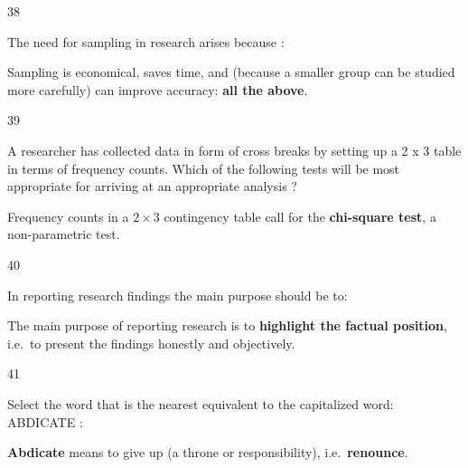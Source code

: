 \begin{question}{38}
{The need for sampling in research arises because :\par}
\begin{explain}
Sampling is economical, saves time, and (because a smaller group can be studied more carefully) can improve accuracy: \textbf{all the above}.
\end{explain}
\end{question}

\begin{question}{39}
{A researcher has collected data in form of cross breaks by setting up a 2 x 3 table in terms of frequency counts. Which of the following tests will be most appropriate for arriving at an appropriate analysis ?\par}
\begin{explain}
Frequency counts in a $2\times3$ contingency table call for the \textbf{chi-square test}, a non-parametric test.
\end{explain}
\end{question}

\begin{question}{40}
{In reporting research findings the main purpose should be to:\par}
\begin{explain}
The main purpose of reporting research is to \textbf{highlight the factual position}, i.e.\ to present the findings honestly and objectively.
\end{explain}
\end{question}

\begin{question}{41}
{Select the word that is the nearest equivalent to the capitalized word: ABDICATE :\par}
\begin{explain}
\textbf{Abdicate} means to give up (a throne or responsibility), i.e.\ \textbf{renounce}.
\end{explain}
\end{question}

